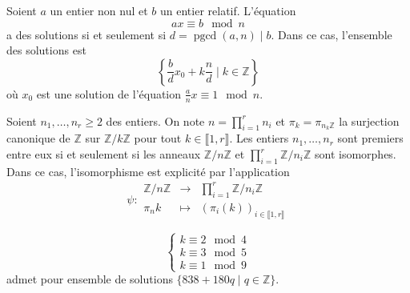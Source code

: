   \begin{corollary}
    Soient $a$ un entier non nul et $b$ un entier relatif. L'équation
    \[ ax \equiv b \mod n \]
    a des solutions si et seulement si $d = \operatorname{pgcd}(a,n) \mid b$. Dans ce cas, l'ensemble des solutions est
    \[ \left\{ \frac{b}{d}x_0 + k\frac{n}{d} \mid k \in \mathbb{Z} \right\} \]
    où $x_0$ est une solution de l'équation $\frac{a}{n}x \equiv 1 \mod n$.
  \end{corollary}


  \begin{theorem}[Chinois]
    Soient $n_1, \dots, n_r \geq 2$ des entiers. On note $n = \prod_{i=1}^r n_i$ et $\pi_k = \pi_{{n_k}\mathbb{Z}}$ la surjection canonique de $\mathbb{Z}$ sur $\mathbb{Z}/k\mathbb{Z}$ pour tout $k \in \llbracket 1, r \rrbracket$.
    \newpar
    Les entiers $n_1, \dots, n_r$ sont premiers entre eux si et seulement si les anneaux $\mathbb{Z}/n\mathbb{Z}$ et $\prod_{i=1}^{r}\mathbb{Z}/n_i\mathbb{Z}$ sont isomorphes. Dans ce cas, l'isomorphisme est explicité par l'application
    \[
    \psi :
    \begin{array}{ccc}
      \mathbb{Z}/n\mathbb{Z} &\rightarrow& \prod_{i=1}^{r}\mathbb{Z}/n_i\mathbb{Z} \\
      \pi_{n}{k} &\mapsto& (\pi_i(k))_{i \in \llbracket 1, r \rrbracket}
    \end{array}
    \]
  \end{theorem}


  \begin{example}
    \[
    \begin{cases}
      k \equiv 2 \mod 4 \\
      k \equiv 3 \mod 5 \\
      k \equiv 1 \mod 9
    \end{cases}
    \]
    admet pour ensemble de solutions $\{ 838+180q \mid q \in \mathbb{Z} \}$.
  \end{example}

